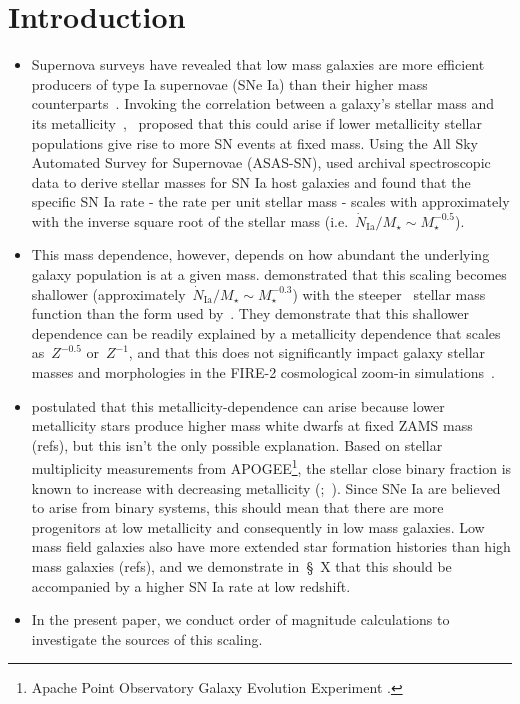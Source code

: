\documentclass[ms.tex]{subfiles}
\begin{document}
\section{Introduction}
\label{sec:intro}

\begin{itemize}

	\item Supernova surveys have revealed that low mass galaxies are
	more efficient producers of type Ia supernovae (SNe Ia) than their higher
	mass counterparts~\citep{Mannucci2005}.
	Invoking the correlation between a galaxy's stellar mass and its
	metallicity~\citep[e.g.][]{Andrews2013},~\citet{Kistler2013} proposed that
	this could arise if lower metallicity stellar populations give rise to
	more SN events at fixed mass.
	Using the All Sky Automated Survey for Supernovae (ASAS-SN),
	\citet{Brown2019} used archival spectroscopic data to derive stellar masses
	for SN Ia host galaxies and found that the specific SN Ia rate - the rate
	per unit stellar mass - scales with approximately with the inverse square
	root of the stellar mass (i.e.~$\dot{N}_\text{Ia} / M_\star \sim
	M_\star^{-0.5}$).
	
	\item This mass dependence, however, depends on how abundant the
	underlying galaxy population is at a given mass.
	\citet{Gandhi2022} demonstrated that this scaling becomes shallower
	(approximately~$\dot{N}_\text{Ia} / M_\star \sim M_\star^{-0.3}$) with
	the steeper~\citet{Baldry2012} stellar mass function than the
	\citet{Bell2003} form used by~\citet{Brown2019}.
	They demonstrate that this shallower dependence can be readily explained
	by a metallicity dependence that scales as~$Z^{-0.5}$ or~$Z^{-1}$, and
	that this does not significantly impact galaxy stellar masses and
	morphologies in the FIRE-2 cosmological zoom-in
	simulations~\citep{Hopkins2018}.
	
	\item \citet{Kistler2013} postulated that this metallicity-dependence can
	arise because lower metallicity stars produce higher mass white dwarfs at
	fixed ZAMS mass (refs), but this isn't the only possible explanation.
	Based on stellar multiplicity measurements from APOGEE\footnote{
		Apache Point Observatory Galaxy Evolution Experiment
		\citep{Majewski2017}.
	}, the stellar close binary fraction is known to increase with decreasing
	metallicity (\citealp{Badenes2018};~\citealp*{Moe2019}).
	Since SNe Ia are believed to arise from binary systems, this should mean
	that there are more progenitors at low metallicity and consequently in low
	mass galaxies.
	Low mass field galaxies also have more extended star formation histories
	than high mass galaxies (refs), and we demonstrate in~\S~X that this
	should be accompanied by a higher SN Ia rate at low redshift.
	
	\item In the present paper, we conduct order of magnitude calculations to
	investigate the sources of this scaling.


\end{itemize}
\end{document}
